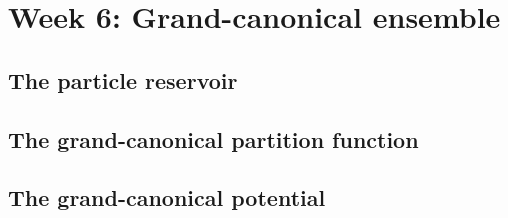 \renewcommand{\thisweek}{MATH327 Week 6}
\renewcommand{\moddate}{Last modified 3 Feb.~2021}
\setcounter{section}{6}
\setcounter{subsection}{0}
{}
\section*{Week 6: Grand-canonical ensemble}
\subsection{The particle reservoir}



\newpage %
\subsection{The grand-canonical partition function}



\newpage %
\subsection{The grand-canonical potential}
